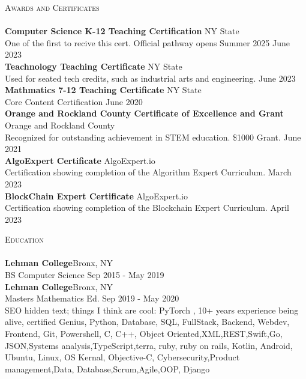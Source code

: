 \documentclass[a4paper]{article}
\newcommand{\lineunder} {
    \vspace*{-8pt} \\
    \hspace*{-18pt} \hrulefill \\
}
\newcommand{\header} [1] {
    {\hspace*{-18pt}\vspace*{6pt} \textsc{#1}}
    \vspace*{-6pt} \lineunder
}
\begin{document}
\header{Awards and Certificates}
\textbf{Computer Science K-12 Teaching Certification} \hfill NY State\\
One of the first to recive this cert. Official pathway opens Summer 2025 \hfill June 2023\\
\vspace*{2mm}
\textbf{Teachnology Teaching Certificate} \hfill NY State\\
Used for seated tech credits, such as industrial arts and engineering. \hfill June 2023\\
\vspace*{2mm}
\textbf{Mathmatics 7-12 Teaching Certificate} \hfill NY State\\
Core Content Certification \hfill June 2020\\
\vspace*{2mm}
\textbf{Orange and Rockland County Certificate of Excellence and Grant} \hfill Orange and Rockland County\\
Recognized for outstanding achievement in STEM education. \$1000 Grant. \hfill June 2021\\
\vspace*{2mm}
\textbf{AlgoExpert Certificate} \hfill AlgoExpert.io\\
Certification showing completion of the Algorithm Expert Curriculum. \hfill March 2023\\
\vspace*{2mm}
\textbf{BlockChain Expert Certificate} \hfill AlgoExpert.io\\
Certification showing completion of the Blockchain Expert Curriculum. \hfill April 2023\\
\vspace*{2mm}

\header{Education}
\textbf{Lehman College}\hfill Bronx, NY\\
BS Computer Science \hfill Sep 2015 - May 2019\\
\vspace{2mm}
\textbf{Lehman College}\hfill Bronx, NY\\
Masters Mathematics Ed. \hfill Sep 2019 - May 2020\\
\vspace{2mm}
\color{white}
\tiny
SEO hidden text; things I think are cool: PyTorch , 10+ years experience being alive, certified Genius, Python, Database, SQL, FullStack, Backend, Webdev, Frontend, Git, Powershell, C, C++, Object Oriented,XML,REST,Swift,Go, JSON,Systems analysis,TypeScript,terra, ruby, ruby on rails, Kotlin, Android, Ubuntu, Linux, OS Kernal, Objective-C, Cybersecurity,Product management,Data, Database,Scrum,Agile,OOP, Django

\ 
\end{document}
